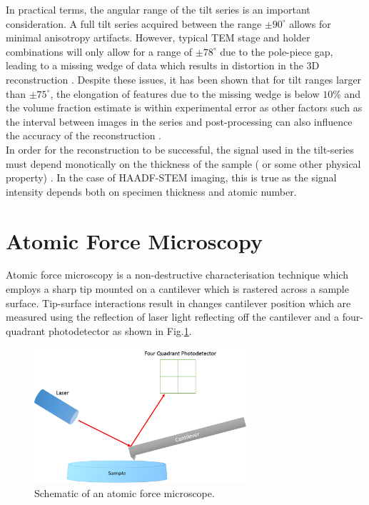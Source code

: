 In practical terms, the angular range of the tilt series is an important consideration. A full tilt series acquired between the range $\pm 90^{\circ}$ allows for minimal anisotropy artifacts. However, typical TEM stage and holder combinations will only allow for a range of $\pm 78^{\circ}$ due to the pole-piece gap, leading to a missing wedge of data which results in distortion in the 3D reconstruction \cite{Mobus2007}. Despite these issues, it has been shown that for tilt ranges larger than $\pm 75^{\circ}$, the elongation of features due to the missing wedge is below $10 \%$ and the volume fraction estimate is within experimental error as other factors such as the interval between images in the series and post-processing can also influence the accuracy of the reconstruction \cite{Kawase2007}. \\
In order for the reconstruction to be successful, the signal used in the tilt-series must depend monotically on the thickness of the sample ( or some other physical property) \cite{Frank2006}. In the case of HAADF-STEM imaging, this is true as the signal intensity depends both on specimen thickness and atomic number.	


\section{Atomic Force Microscopy}
Atomic force microscopy   is a non-destructive characterisation technique which employs a sharp tip mounted on a cantilever which is rastered across a sample surface. Tip-surface interactions result in changes cantilever position which are measured using the reflection of laser light reflecting off the cantilever and a four-quadrant photodetector as shown in Fig.\ref{2.1}.

\begin{figure}[h]
	\centering
	\includegraphics[width=0.7\textwidth]{Figs/Ch2/AFM.png}
	\caption {Schematic of an atomic force microscope.}
	\label{2.1}
\end{figure}
\FloatBarrier

